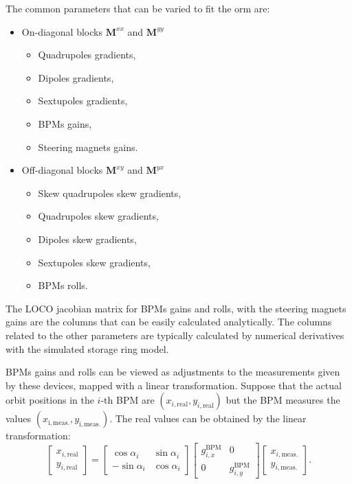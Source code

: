 The common parameters that can be varied to fit the \gls{orm} are:
\begin{itemize}
    \item On-diagonal blocks $\mathbf{M}^{xx}$ and $\mathbf{M}^{yy}$
    \begin{itemize}
        \item Quadrupoles gradients,
        \item Dipoles gradients,
        \item Sextupoles gradients,
        \item BPMs gains,
        \item Steering magnets gains.
    \end{itemize}
    \item Off-diagonal blocks $\mathbf{M}^{xy}$ and $\mathbf{M}^{yx}$
    \begin{itemize}
        \item Skew quadrupoles skew gradients,
        \item Quadrupoles skew gradients,
        \item Dipoles skew gradients,
        \item Sextupoles skew gradients,
        \item BPMs rolls.
    \end{itemize}
\end{itemize}
The LOCO jacobian matrix for BPMs gains and rolls, with the steering magnets gains are the columns that can be easily calculated analytically. The columns related to the other parameters are typically calculated by numerical derivatives with the simulated storage ring model. 

BPMs gains and rolls can be viewed as adjustments to the measurements given by these devices, mapped with a linear transformation. Suppose that the actual orbit positions in the $i$-th BPM are $(x_{i, \mathrm{real}}, y_{i, \mathrm{real}})$ but the BPM measures the values $(x_{\mathrm{i, meas.}}, y_{\mathrm{i, meas.}})$. The real values can be obtained by the linear transformation:
\begin{equation}
    \begin{bmatrix}
      x_{i, \mathrm{real}} \\
      y_{i, \mathrm{real}}
\end{bmatrix} = \begin{bmatrix}
     \cos\alpha_i & \sin\alpha_i \\
     -\sin\alpha_i & \cos\alpha_i
 \end{bmatrix} \begin{bmatrix}
     g_{i, x}^{\mathrm{BPM}} & 0 \\
     0 & g_{i, y}^{\mathrm{BPM}}
 \end{bmatrix}
 \begin{bmatrix}
      x_{i, \mathrm{meas.}} \\
      y_{i, \mathrm{meas.}}
\end{bmatrix}.
\label{eq:bpm_gain1}
\end{equation}

